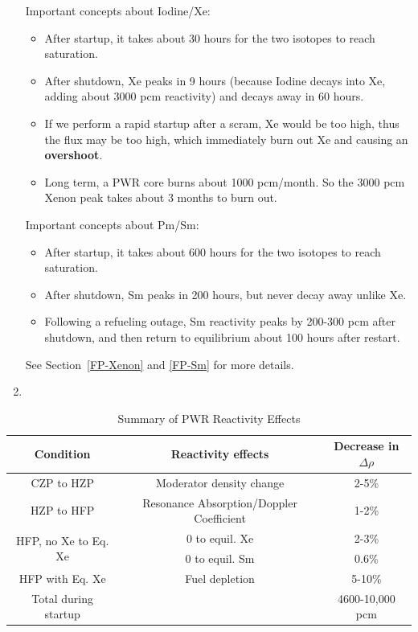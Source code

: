 \documentclass{school-22.211-notes}
\begin{document}
\begin{enumerate}
  Important concepts about Iodine/Xe:
  \begin{itemize}
  \item After startup, it takes about 30 hours for the two isotopes to reach saturation. 
  \item After shutdown, Xe peaks in 9 hours (because Iodine decays into Xe, adding about 3000 pcm reactivity) and decays away in 60 hours. 
  \item If we perform a rapid startup after a scram, Xe would be too high, thus the flux may be too high, which immediately burn out Xe and causing an \textbf{overshoot}. 
  \item Long term, a PWR core burns about 1000 pcm/month. So the 3000 pcm Xenon peak takes about 3 months to burn out. 
  \end{itemize}

  Important concepts about Pm/Sm: 
  \begin{itemize}
  \item After startup, it takes about 600 hours for the two isotopes to reach saturation. 
  \item After shutdown, Sm peaks in 200 hours, but never decay away unlike Xe. 
  \item Following a refueling outage, Sm reactivity peaks by 200-300 pcm after shutdown, and then return to equilibrium about 100 hours after restart. 
  \end{itemize}
  See Section~\ref{FP-Xenon} and \ref{FP-Sm} for more details.

\item {}
\end{enumerate}

\begin{table}[ht]
  \centering
  \begin{tabular}{c|c|c} \hline
    Condition & Reactivity effects & Decrease in $\Delta \rho$ \\ \hline
    CZP to HZP & Moderator density change & 2-5\% \\ \hline
    HZP to HFP & Resonance Absorption/Doppler Coefficient & 1-2\% \\ \hline
    \multirow{2}{*}{HFP, no Xe to Eq. Xe} & 0 to equil. Xe & 2-3\% \\ 
    & 0 to equil. Sm & 0.6\% \\ \hline
    HFP with Eq. Xe & Fuel depletion & 5-10\% \\ \hline \hline
    Total during startup &   & 4600-10,000 pcm \\ \hline
  \end{tabular}
  \caption{Summary of PWR Reactivity Effects} \label{PWR-reactivity}
\end{table}
\end{document}
